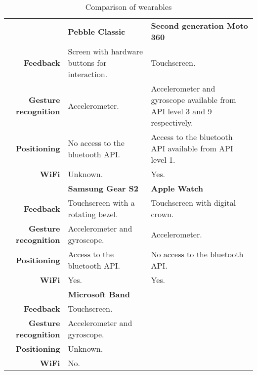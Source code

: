 \renewcommand{\arraystretch}{1.2}
\begin{table}[htb]
\centering
\caption{Comparison of wearables}
\label{tbl:analysis:choice-of-wearable}
\begin{tabularx}{\linewidth}{rXX}
\multicolumn{1}{l}{\textbf{}}     & \textbf{Pebble Classic}                       & \textbf{Second generation Moto 360} \\
\textbf{Feedback} & Screen with hardware buttons for interaction. & Touchscreen.                        \\
\textbf{Gesture recognition}      & Accelerometer. \cite{pebble:accelerometer}                                & Accelerometer and gyroscope available from API level 3 and 9 respectively. \cite{motorola:moto360, android:creating-wearable-apps, android:motion-sensors, android:sensors-overview}        \\
\textbf{Positioning}              & No access to the bluetooth API.               & Access to the bluetooth API available from API level 1. \cite{motorola:moto360, android:creating-wearable-apps, android:bluetooth, android:broadcast-receiver}        \\
\textbf{WiFi}                     & Unknown.    & Yes.                                \\
\multicolumn{1}{l}{}              & \textbf{Samsung Gear S2}                      & \textbf{Apple Watch}                \\
\textbf{Feedback} & Touchscreen with a rotating bezel.             & Touchscreen with digital crown.     \\
\textbf{Gesture recognition}      & Accelerometer and gyroscope. \cite{samsung:gears2, tizen:sensors}                  & Accelerometer.                      \\
\textbf{Positioning}              & Access to the bluetooth API. \cite{samsung:gears2, tizen:bluetooth}                  & No access to the bluetooth API.     \\
\textbf{WiFi}                     & Yes.                                          & Yes.                               \\
\multicolumn{1}{l}{}              & \textbf{Microsoft Band}                      & ~                \\
\textbf{Feedback} & Touchscreen.            & ~     \\
\textbf{Gesture recognition}      & Accelerometer and gyroscope. \cite{microsoft:band-sdk, microsoft:band-sdk-documentation}                  & ~                      \\
\textbf{Positioning}              & Unknown.                  & ~     \\
\textbf{WiFi}                     & No.                                          & ~                               
\end{tabularx}
\end{table}

